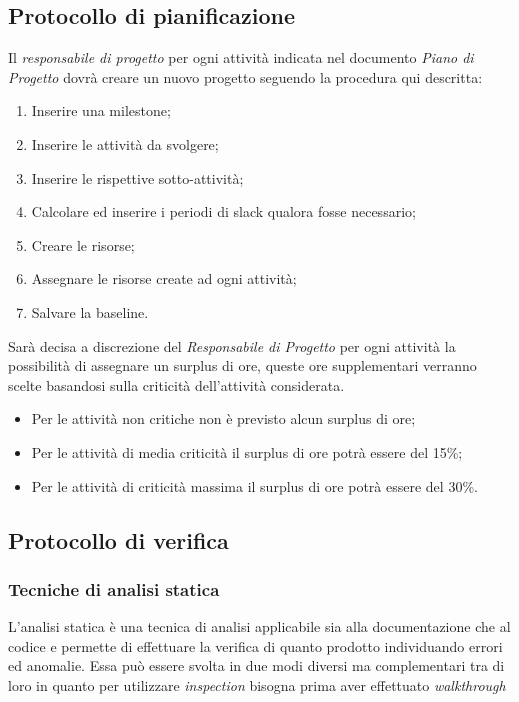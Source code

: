 \subsection{Protocollo di pianificazione}
Il \textit{responsabile di progetto} per ogni attività indicata nel documento \textit{Piano di Progetto} dovrà creare un nuovo progetto seguendo la procedura qui descritta:

\begin{enumerate}
\item Inserire una milestone;
\item Inserire le attività da svolgere;
\item Inserire le rispettive sotto-attività;
\item Calcolare ed inserire i periodi di slack qualora fosse necessario;
\item Creare le risorse;
\item Assegnare le risorse create ad ogni attività;
\item Salvare la baseline.
\end{enumerate}

Sarà decisa a discrezione del \textit{Responsabile di Progetto} per ogni attività la possibilità di assegnare un surplus di ore, queste ore supplementari verranno scelte basandosi sulla criticità dell'attività considerata.

\begin{itemize}
\item Per le attività non critiche non è previsto alcun surplus di ore;
\item Per le attività di media criticità il surplus di ore potrà essere del 15\%;
\item Per le attività di criticità massima il surplus di ore potrà essere del 30\%.
\end{itemize}
\subsection{Protocollo di verifica}
\subsubsection{Tecniche di analisi statica}
L'analisi statica è una tecnica di analisi applicabile sia alla documentazione che al codice e permette di effettuare la verifica di quanto prodotto individuando errori ed anomalie. Essa può essere svolta in due modi diversi ma complementari tra di loro in quanto per utilizzare \textit{inspection} bisogna prima aver effettuato \textit{walkthrough}

